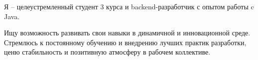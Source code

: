 \par{
Я -- целеустремленный студент 3 курса и backend-разработчик с опытом работы c Java.

Ищу возможность развивать свои навыки в динамичной и инновационной среде.
Стремлюсь к постоянному обучению и внедрению лучших практик разработки, ценю стабильность и позитивную атмосферу в рабочем коллективе.
}
\vspace{1em}
